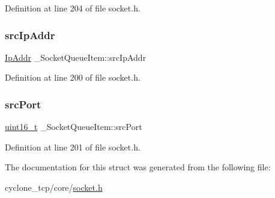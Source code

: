 Definition at line 204 of file socket.\+h.

\mbox{\label{struct__SocketQueueItem_a35f1157ded7017ef108d8875d2cedfa7}} 
\subsubsection{\texorpdfstring{src\+Ip\+Addr}{srcIpAddr}}
{\footnotesize\ttfamily \hyperlink{structIpAddr}{Ip\+Addr} \+\_\+\+Socket\+Queue\+Item\+::src\+Ip\+Addr}



Definition at line 200 of file socket.\+h.

\mbox{\label{struct__SocketQueueItem_aae5da9b297543edc1b28914115ee928b}} 
\subsubsection{\texorpdfstring{src\+Port}{srcPort}}
{\footnotesize\ttfamily \hyperlink{stdint_8h_a273cf69d639a59973b6019625df33e30}{uint16\+\_\+t} \+\_\+\+Socket\+Queue\+Item\+::src\+Port}



Definition at line 201 of file socket.\+h.



The documentation for this struct was generated from the following file\+:\begin{DoxyCompactItemize}
\item 
cyclone\+\_\+tcp/core/\hyperlink{socket_8h}{socket.\+h}\end{DoxyCompactItemize}
